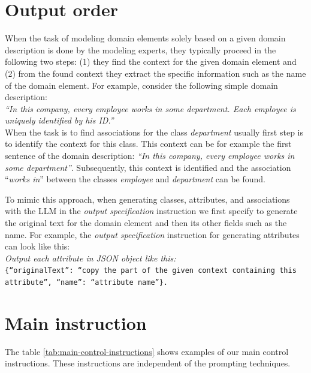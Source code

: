 \section{Output order}
\label{sec:output_order}

When the task of modeling domain elements solely based on a given domain description is done by the modeling experts, they typically proceed in the following two steps: (1) they find the context for the given domain element and (2) from the found context they extract the specific information such as the name of the domain element. For example, consider the following simple domain description: \\

\noindent{}\textit{``In this company, every employee works in some department. Each employee is uniquely identified by his ID.''} \\

\noindent{}When the task is to find associations for the class \textit{department} usually first step is to identify the context for this class. This context can be for example the first sentence of the domain description: \textit{``In this company, every employee works in some department''}. Subsequently, this context is identified and the association ``\textit{works in}'' between the classes \textit{employee} and \textit{department} can be found.

To mimic this approach, when generating classes, attributes, and associations with the LLM in the \emph{output specification} instruction we first specify to generate the original text for the domain element and then its other fields such as the name. For example, the \emph{output specification} instruction for generating attributes can look like this: \\

\noindent{}\textit{Output each attribute in JSON object like this:} \\
\texttt{\frenchspacing\{``originalText'': ``copy the part of the given context containing \\ this attribute'', ``name'': ``attribute name''\}.}


\section{Main instruction}

The table \ref{tab:main-control-instructions} shows examples of our main control instructions. These instructions are independent of the prompting techniques. \\

